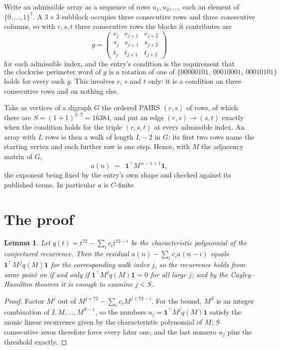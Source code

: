 \documentclass[11pt,a4paper]{article}
\theoremstyle{plain}
\newtheorem{lemma}[theorem]{Lemma}
\theoremstyle{definition}
\begin{document}
Write an admissible array as a sequence of rows $u_1,u_2,\dots$, each an element of
$\{0,\dots,1\}^{7}$. A $3\times3$ subblock occupies three consecutive rows and
three consecutive columns, so with $r,s,t$ three consecutive rows the blocks it
contributes are
\[
g=\begin{pmatrix}r_j&r_{j+1}&r_{j+2}\\ s_j&s_{j+1}&s_{j+2}\\ t_j&t_{j+1}&t_{j+2}\end{pmatrix}
\]
for each admissible index, and the entry's condition is the requirement that
\[
\text{the clockwise perimeter word of }g\text{ is a rotation of one of }\{00000101,\ 00010001,\ 00010101\}
\]
holds for every such $g$. This involves $r$, $s$ and $t$ only: it is a condition on
three consecutive rows and on nothing else.

Take as vertices of a digraph $G$ the ordered PAIRS $(r,s)$ of rows, of which there are
$S=(1+1)^{2\cdot7}=16384$, and put an edge $(r,s)\to(s,t)$ exactly when the condition
holds for the triple $(r,s,t)$ at every admissible index. An array with $L$ rows is then a
walk of length $L-2$ in $G$: its first two rows name the starting vertex and each further
row is one step. Hence, with $M$ the adjacency matrix of $G$,
\[
a(n)\;=\;\,\mathbf{1}^{\!\top}M^{\,n-1+1}\mathbf{1},
\]
the exponent being fixed by the entry's own shape and checked against its published terms.
In particular $a$ is $C$-finite.

\section{The proof}

\begin{lemma}\label{lem:crit}
Let $q(t)=t^{72}-\sum_i c_it^{72-i}$ be the characteristic polynomial of the
conjectured recurrence. Then the residual $a(n)-\sum_ic_ia(n-i)$ equals
$\mathbf{1}^{\!\top}M^{\,j}q(M)\mathbf{1}$ for the corresponding walk index
$j$, so the recurrence holds from some point on if and only if
$\mathbf{1}^{\!\top}M^{j}q(M)\mathbf{1}=0$ for all large $j$; and by the
Cayley--Hamilton theorem it is enough to examine $j<S$.
\end{lemma}

\begin{proof}
Factor $M^{j}$ out of $M^{j+72}-\sum_ic_iM^{j+72-i}$. For the bound, $M^{S}$
is an integer combination of $I,M,\dots,M^{S-1}$, so the numbers
$u_j=\mathbf{1}^{\!\top}M^{j}q(M)\mathbf{1}$ satisfy the monic linear recurrence given by
the characteristic polynomial of $M$; $S$ consecutive zeros therefore force every later one,
and the last nonzero $u_j$ pins the threshold exactly.
\end{proof}
\end{document}
